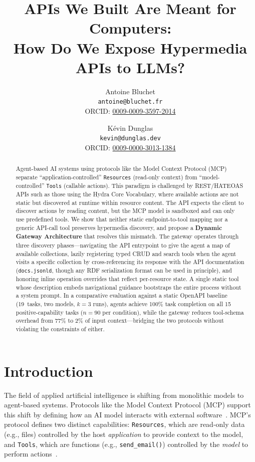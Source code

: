 \documentclass[11pt,a4paper]{article}
\title{\textbf{APIs We Built Are Meant for Computers:\\How Do We Expose Hypermedia APIs to LLMs?}}
\author{Antoine Bluchet\\\texttt{antoine@bluchet.fr}\\ORCID: \href{https://orcid.org/0009-0009-3597-2014}{0009-0009-3597-2014}
\and
K\'{e}vin Dunglas\\\texttt{kevin@dunglas.dev}\\ORCID: \href{https://orcid.org/0009-0000-3013-1384}{0009-0000-3013-1384}}
\date{}
\begin{document}
\maketitle


\begin{abstract}
Agent-based AI systems using protocols like the Model Context Protocol (MCP) separate ``application-controlled'' \texttt{Resources} (read-only context) from ``model-controlled'' \texttt{Tools} (callable actions). This paradigm is challenged by REST/HATEOAS APIs such as those using the Hydra Core Vocabulary, where available actions are not static but discovered at runtime within resource content. The API expects the client to discover actions by reading content, but the MCP model is sandboxed and can only use predefined tools. We show that neither static endpoint-to-tool mapping nor a generic API-call tool preserves hypermedia discovery, and propose a \textbf{Dynamic Gateway Architecture} that resolves this mismatch. The gateway operates through three discovery phases---navigating the API entrypoint to give the agent a map of available collections, lazily registering typed CRUD and search tools when the agent visits a specific collection by cross-referencing its response with the API documentation (\texttt{docs.jsonld}, though any RDF serialization format can be used in principle), and honoring inline operation overrides that reflect per-resource state. A single static tool whose description embeds navigational guidance bootstraps the entire process without a system prompt. In a comparative evaluation against a static OpenAPI baseline (19~tasks, two models, $k{=}3$ runs), agents achieve 100\% task completion on all 15 positive-capability tasks ($n{=}90$ per condition), while the gateway reduces tool-schema overhead from 77\% to 2\% of input context---bridging the two protocols without violating the constraints of either.
\end{abstract}

\section{Introduction}

The field of applied artificial intelligence is shifting from monolithic models to agent-based systems. Protocols like the Model Context Protocol (MCP) support this shift by defining how an AI model interacts with external software~\cite{mcp-overview}. MCP's protocol defines two distinct capabilities: \texttt{Resources}, which are read-only data (e.g., files) controlled by the host \emph{application} to provide context to the model, and \texttt{Tools}, which are functions (e.g., \texttt{send\_email()}) controlled by the \emph{model} to perform actions~\cite{mcp-resources,mcp-tools}.
\end{document}
